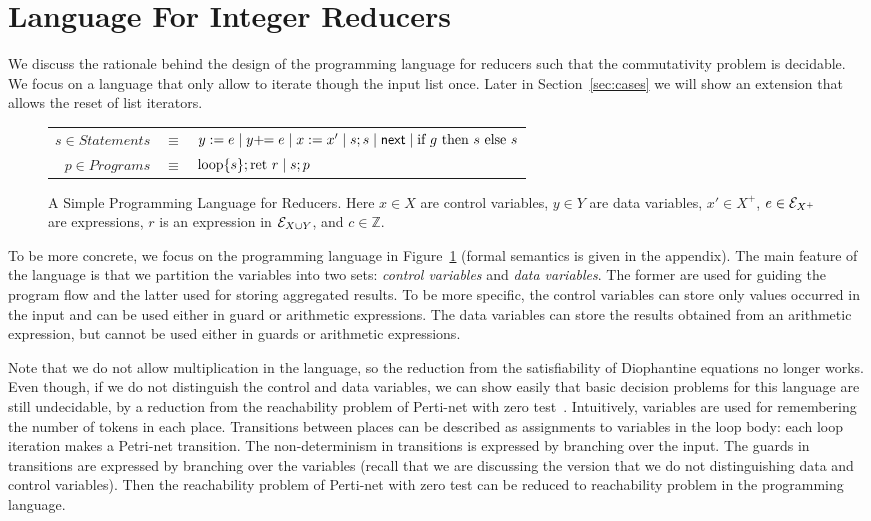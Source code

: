  
\section{Language For Integer Reducers}\label{sec-mr-prog}
\label{sec:language}
We discuss the rationale behind the design of the programming language for reducers such that the commutativity problem is decidable.
We focus on a language that only allow to iterate though the input list once. Later in Section~\ref{sec:cases} we will show an extension that allows the reset of list iterators.

\begin{figure}
	\vspace{-0.5cm}
	\centering
	\begin{tabular}{rcl}
        $ s \in Statements$&$\equiv$&$y := e\mid y +\!\!= e \mid x:=x'\mid s;s\mid \mathsf{next} \mid \mbox{if } g \mbox{ then } s\mbox{ else }s$\\
		$ p\in Programs$&$\equiv$&$\mbox{loop\{} s\mbox{\}};\mbox{ret }r \mid s;p$		
	\end{tabular}
	\label{fig:language}
	\caption{A Simple Programming Language for Reducers. Here $x\in X$ are control variables, $y\in Y$ are data variables, $x' \in X^+$, $e\in {\mathcal{E} }_{X^+}$ are expressions, $r$ is an expression in ${\mathcal{E} }_{X \cup Y}$, and $c\in \mathbb{Z}$.}
	\vspace{-0.5cm}
\end{figure}

To be more concrete, we focus on the programming language in Figure~\ref{fig:language} (formal semantics is given in the appendix).
The main feature of the language is that we partition the variables into two sets: \emph{control variables} and \emph{data variables}.
The former are used for guiding the program flow and the latter used for storing aggregated results.
To be more specific, the control variables can store only values occurred in the input and can be used either in guard or arithmetic expressions.
The data variables can store the results obtained from an arithmetic expression, but cannot be used either in guards or arithmetic expressions.

Note that we do not allow multiplication in the language, so the reduction from the satisfiability of Diophantine equations no longer works. Even though, if we do not distinguish the control and data variables, we can show easily that basic decision problems for this language are still undecidable, by a reduction from the reachability problem of Perti-net with zero test~\cite{petri}.
Intuitively, variables are used for remembering the number of tokens in each place. Transitions between places can be described as assignments to variables in the loop body: each loop iteration makes a Petri-net transition. 
The non-determinism in transitions is expressed by branching over the input. 
The guards in transitions are expressed by branching over the variables (recall that we are discussing the version that we do not distinguishing data and control variables). Then the reachability problem of Perti-net with zero test can be reduced to reachability problem in the programming language.

